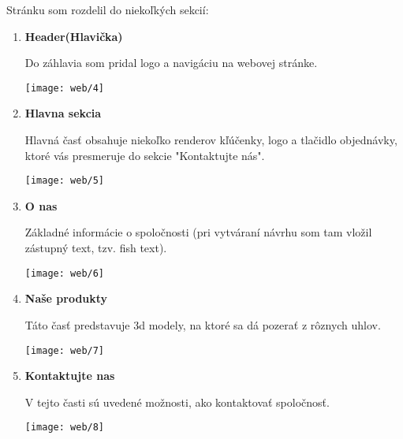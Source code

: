       \newpage
      Stránku som rozdelil do niekoľkých sekcií: \\
      \begin{enumerate}
        \item{
            \textbf{Header(Hlavička)}

            Do záhlavia som pridal logo a navigáciu na webovej stránke.

            \begin{center}
              \texttt{[image: web/4]}
            \end{center}
        }
        \item{
            \textbf{Hlavna sekcia}

            Hlavná časť obsahuje niekoľko renderov kľúčenky, logo a tlačidlo objednávky, ktoré vás presmeruje do sekcie "Kontaktujte nás".

            \begin{center}
              \texttt{[image: web/5]}
            \end{center}
        }
        \item{
            \textbf{O nas}

            Základné informácie o spoločnosti (pri vytváraní návrhu som tam vložil zástupný text, tzv. fish text).

            \begin{center}
              \texttt{[image: web/6]}
            \end{center}
        }
        \item{
            \textbf{Naše produkty}

            Táto časť predstavuje 3d modely, na ktoré sa dá pozerať z rôznych uhlov.

            \begin{center}
              \texttt{[image: web/7]}
            \end{center}
        }
        \item{
            \textbf{Kontaktujte nas}

            V tejto časti sú uvedené možnosti, ako kontaktovať spoločnosť.

            \begin{center}
              \texttt{[image: web/8]}
            \end{center}
        }
      \end{enumerate}

      \newpage

